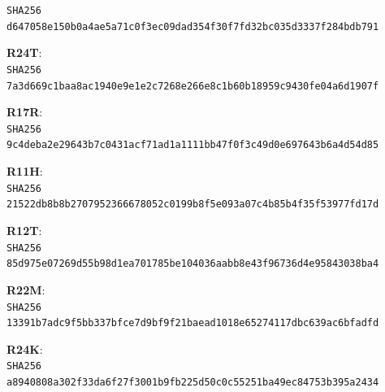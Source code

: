\documentclass[11pt,a4paper]{article}
\begin{document}
\texttt{SHA256 d647058e150b0a4ae5a71c0f3ec09dad\allowbreak 354f30f7fd32bc035d3337f284bdb791}\par\medskip
\textbf{R24T}: \\
\texttt{SHA256 7a3d669c1baa8ac1940e9e1e2c7268e2\allowbreak 66e8c1b60b18959c9430fe04a6d1907f}\par\medskip
\textbf{R17R}: \\
\texttt{SHA256 9c4deba2e29643b7c0431acf71ad1a11\allowbreak 11bb47f0f3c49d0e697643b6a4d54d85}\par\medskip
\textbf{R11H}: \\
\texttt{SHA256 21522db8b8b2707952366678052c0199\allowbreak b8f5e093a07c4b85b4f35f53977fd17d}\par\medskip
\textbf{R12T}: \\
\texttt{SHA256 85d975e07269d55b98d1ea701785be10\allowbreak 4036aabb8e43f96736d4e95843038ba4}\par\medskip
\textbf{R22M}: \\
\texttt{SHA256 13391b7adc9f5bb337bfce7d9bf9f21b\allowbreak aead1018e65274117dbc639ac6bfadfd}\par\medskip
\textbf{R24K}: \\
\texttt{SHA256 a8940808a302f33da6f27f3001b9fb22\allowbreak 5d50c0c55251ba49ec84753b395a2434}\par\medskip
\endgroup
\clearpage
\end{document}
